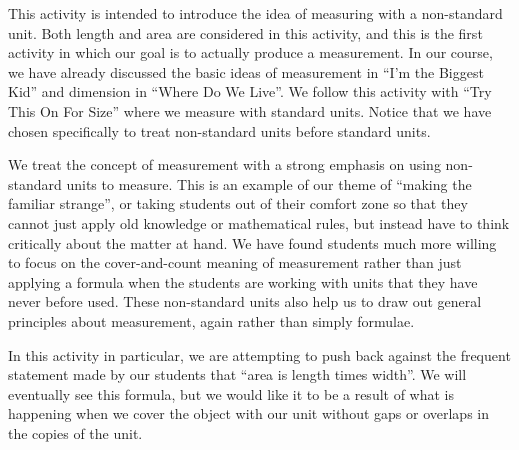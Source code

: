 \documentclass{ximera}
\begin{document}
\newpage

\begin{instructorNotes}
This activity is intended to introduce the idea of measuring with a non-standard unit.  Both length and area are considered in this activity, and this is the first activity in which our goal is to actually produce a measurement.  In our course, we have already discussed the basic ideas of measurement in ``I'm the Biggest Kid'' and dimension in ``Where Do We Live''.  We follow this activity with ``Try This On For Size'' where we measure with standard units.  Notice that we have chosen specifically to treat non-standard units before standard units.

We treat the concept of measurement with a strong emphasis on using non-standard units to measure.  This is an example of our theme of ``making the familiar strange'', or taking students out of their comfort zone so that they cannot just apply old knowledge or mathematical rules, but instead have to think critically about the matter at hand.  We have found students much more willing to focus on the cover-and-count meaning of measurement rather than just applying a formula when the students are working with units that they have never before used.  These non-standard units also help us to draw out general principles about measurement, again rather than simply formulae.

In this activity in particular, we are attempting to push back against the frequent statement made by our students that ``area is length times width''.  We will eventually see this formula, but we would like it to be a result of what is happening when we cover the object with our unit without gaps or overlaps in the copies of the unit.



\end{instructorNotes}
\end{document}
